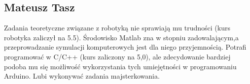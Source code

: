 \subsection{Mateusz Tasz}
Zadania teoretyczne związane z robotyką nie sprawiają mu trudności (kurs robotyka zaliczył na 5.5). Środowisko Matlab zna w stopniu zadowalającym,a przeprowadzanie symulacji komputerowych jest dla niego przyjemnością. Potrafi programować w C/C++ (kurs zaliczony na 5,0), ale zdecydowanie bardziej podoba mu się możliwość wykorzystania tych umiejętności w programowaniu Arduino. Lubi wykonywać zadania majsterkowania.

